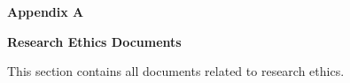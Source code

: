 %
%
%                 

\textbf{\Huge Appendix A}
\bigskip

\textbf{\LARGE Research Ethics Documents}

\bigskip
This section contains all documents related to research ethics.

\newpage
\setlength{\voffset}{0cm}
\setlength{\hoffset}{0cm}




